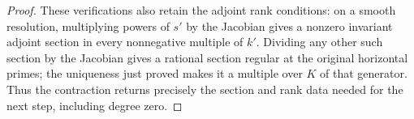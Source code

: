 \begin{proof}
These verifications also retain the adjoint rank conditions:
on a smooth resolution, multiplying powers of \(s'\) by the
Jacobian gives a nonzero invariant adjoint section in every
nonnegative multiple of $k'$.  Dividing any other such section by the
Jacobian gives a rational section regular at the original
horizontal primes; the uniqueness just proved makes it a
multiple over \(K\) of that generator.  Thus the contraction
returns precisely the section and rank data needed for the next
step, including degree zero.
\end{proof}
